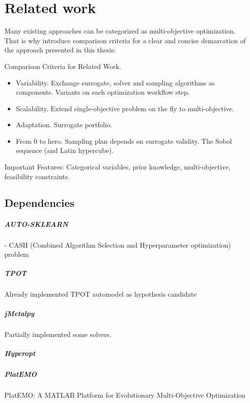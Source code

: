 \chapter{Related work}
    Many existing approaches can be categorized as multi-objective optimization. That is why
    introduce comparison criteria for a clear and concise demarcation of the approach presented in this thesis:

    Comparison Criteria for Related Work. 
    \begin{itemize}
        \item Variability. Exchange surrogate, solver and sampling algorithms as components. Variants on each optimization workflow step.
        \item Scalability. Extend single-objective problem on the fly to multi-objective.
        \item Adaptation. Surrogate portfolio.
        \item From 0 to hero. Sampling plan depends on surrogate validity. The Sobol sequence (and Latin hypercube).                
    \end{itemize}
    Important Features: Categorical variables, prior knowledge, multi-objective, feasibility constraints.



    \section{Dependencies}

    \paragraph{AUTO-SKLEARN} \cite{autosklearn:feurer2015efficient}
    - CASH (Combined Algorithm Selection and Hyperparameter optimization) problem

    \paragraph{TPOT} \cite{OlsonGECCO2016}
    Already implemented TPOT automodel as hypothesis candidate

    \paragraph{jMetalpy} \cite{benitezhidalgo2019jmetalpy}
    Partially implemented some solvers.

    \paragraph{Hyperopt}

    

    \paragraph{PlatEMO} \cite{PlatEMO}
    PlatEMO: A MATLAB Platform for Evolutionary Multi-Objective Optimization
